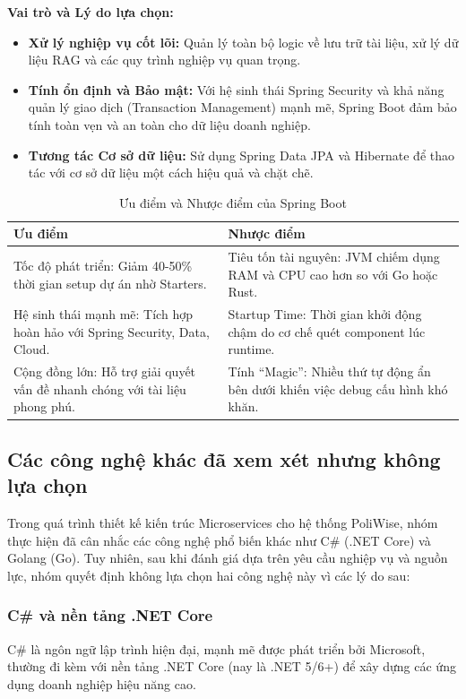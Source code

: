 \documentclass[12pt,a4paper]{report}
\begin{document}
\textbf{Vai trò và Lý do lựa chọn:}
\begin{itemize}
    \item \textbf{Xử lý nghiệp vụ cốt lõi:} Quản lý toàn bộ logic về lưu trữ tài liệu, xử lý dữ liệu RAG và các quy trình nghiệp vụ quan trọng.
    \item \textbf{Tính ổn định và Bảo mật:} Với hệ sinh thái Spring Security và khả năng quản lý giao dịch (Transaction Management) mạnh mẽ, Spring Boot đảm bảo tính toàn vẹn và an toàn cho dữ liệu doanh nghiệp.
    \item \textbf{Tương tác Cơ sở dữ liệu:} Sử dụng Spring Data JPA và Hibernate để thao tác với cơ sở dữ liệu một cách hiệu quả và chặt chẽ.
\end{itemize}

\begin{table}[H]
\centering
\caption{Ưu điểm và Nhược điểm của Spring Boot}
\label{tab:springboot_pros_cons}
\begin{tabularx}{\textwidth}{|X|X|}
\hline
\textbf{Ưu điểm} & \textbf{Nhược điểm} \\ \hline
Tốc độ phát triển: Giảm 40-50\% thời gian setup dự án nhờ Starters. & Tiêu tốn tài nguyên: JVM chiếm dụng RAM và CPU cao hơn so với Go hoặc Rust. \\ \hline
Hệ sinh thái mạnh mẽ: Tích hợp hoàn hảo với Spring Security, Data, Cloud. & Startup Time: Thời gian khởi động chậm do cơ chế quét component lúc runtime. \\ \hline
Cộng đồng lớn: Hỗ trợ giải quyết vấn đề nhanh chóng với tài liệu phong phú. & Tính ``Magic'': Nhiều thứ tự động ẩn bên dưới khiến việc debug cấu hình khó khăn. \\ \hline
\end{tabularx}
\end{table}

\subsection{Các công nghệ khác đã xem xét nhưng không lựa chọn}
Trong quá trình thiết kế kiến trúc Microservices cho hệ thống PoliWise, nhóm thực hiện đã cân nhắc các công nghệ phổ biến khác như C\# (.NET Core) và Golang (Go). Tuy nhiên, sau khi đánh giá dựa trên yêu cầu nghiệp vụ và nguồn lực, nhóm quyết định không lựa chọn hai công nghệ này vì các lý do sau:

\subsubsection{C\# và nền tảng .NET Core}
C\# là ngôn ngữ lập trình hiện đại, mạnh mẽ được phát triển bởi Microsoft, thường đi kèm với nền tảng .NET Core (nay là .NET 5/6+) để xây dựng các ứng dụng doanh nghiệp hiệu năng cao.
\end{document}
